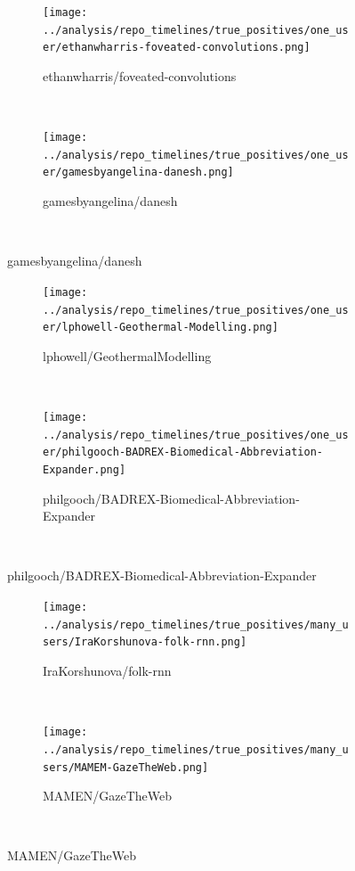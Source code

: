 \documentclass[10pt,a4paper]{scrartcl}
\begin{document}
\begin{figure}[h]
    \centering
    \begin{subfigure}[t]{0.8\textwidth}
        \centering
        \texttt{[image: ../analysis/repo\_timelines/true\_positives/one\_user/ethanwharris-foveated-convolutions.png]}
        \caption{ethanwharris/foveated-convolutions}
    \end{subfigure}\\
    \begin{subfigure}[t]{0.8\textwidth}
        \centering
        \texttt{[image: ../analysis/repo\_timelines/true\_positives/one\_user/gamesbyangelina-danesh.png]}
        \caption{gamesbyangelina/danesh}
    \end{subfigure}\\
\end{figure}
\begin{figure}[h]\ContinuedFloat
    \centering
    \begin{subfigure}[t]{0.8\textwidth}
        \centering
        \texttt{[image: ../analysis/repo\_timelines/true\_positives/one\_user/lphowell-Geothermal-Modelling.png]}
        \caption{lphowell/GeothermalModelling}
    \end{subfigure}\\
    \begin{subfigure}[t]{0.8\textwidth}
        \centering
        \texttt{[image: ../analysis/repo\_timelines/true\_positives/one\_user/philgooch-BADREX-Biomedical-Abbreviation-Expander.png]}
        \caption{philgooch/BADREX-Biomedical-Abbreviation-Expander}
    \end{subfigure}\\
\end{figure}
\begin{figure}[h]\ContinuedFloat
    \centering
    \begin{subfigure}[t]{0.8\textwidth}
        \centering
        \texttt{[image: ../analysis/repo\_timelines/true\_positives/many\_users/IraKorshunova-folk-rnn.png]}
        \caption{IraKorshunova/folk-rnn}
    \end{subfigure}\\
    \begin{subfigure}[t]{0.8\textwidth}
        \centering
        \texttt{[image: ../analysis/repo\_timelines/true\_positives/many\_users/MAMEM-GazeTheWeb.png]}
        \caption{MAMEN/GazeTheWeb}
    \end{subfigure}\\
\end{figure}
\end{document}
